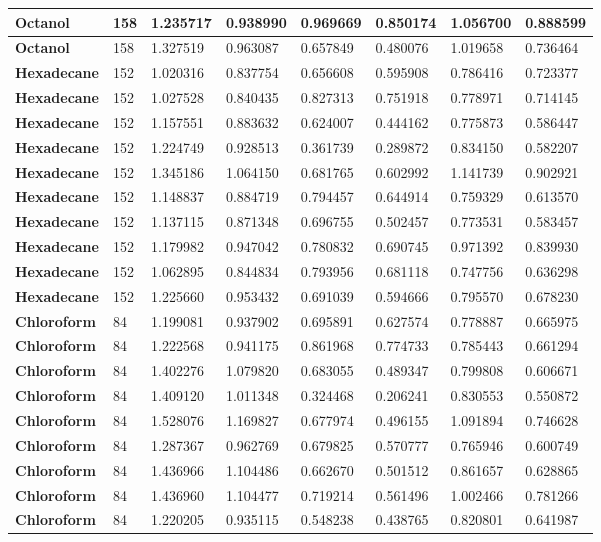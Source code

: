 \documentclass{amsart}
\begin{document}
\begin{center}
\begin{tabular}{|l|l|l|l|l|l|l|l|}
\textbf{Octanol}&158&1.235717&0.938990&0.969669&0.850174&1.056700&0.888599 \\ \hline 
\textbf{Octanol}&158&1.327519&0.963087&0.657849&0.480076&1.019658&0.736464 \\ \hline 
\textbf{Hexadecane}&152&1.020316&0.837754&0.656608&0.595908&0.786416&0.723377 \\ \hline 
\textbf{Hexadecane}&152&1.027528&0.840435&0.827313&0.751918&0.778971&0.714145 \\ \hline 
\textbf{Hexadecane}&152&1.157551&0.883632&0.624007&0.444162&0.775873&0.586447 \\ \hline 
\textbf{Hexadecane}&152&1.224749&0.928513&0.361739&0.289872&0.834150&0.582207 \\ \hline 
\textbf{Hexadecane}&152&1.345186&1.064150&0.681765&0.602992&1.141739&0.902921 \\ \hline 
\textbf{Hexadecane}&152&1.148837&0.884719&0.794457&0.644914&0.759329&0.613570 \\ \hline 
\textbf{Hexadecane}&152&1.137115&0.871348&0.696755&0.502457&0.773531&0.583457 \\ \hline 
\textbf{Hexadecane}&152&1.179982&0.947042&0.780832&0.690745&0.971392&0.839930 \\ \hline 
\textbf{Hexadecane}&152&1.062895&0.844834&0.793956&0.681118&0.747756&0.636298 \\ \hline 
\textbf{Hexadecane}&152&1.225660&0.953432&0.691039&0.594666&0.795570&0.678230 \\ \hline 
\textbf{Chloroform}& 84&1.199081&0.937902&0.695891&0.627574&0.778887&0.665975 \\ \hline 
\textbf{Chloroform}& 84&1.222568&0.941175&0.861968&0.774733&0.785443&0.661294 \\ \hline 
\textbf{Chloroform}& 84&1.402276&1.079820&0.683055&0.489347&0.799808&0.606671 \\ \hline 
\textbf{Chloroform}& 84&1.409120&1.011348&0.324468&0.206241&0.830553&0.550872 \\ \hline 
\textbf{Chloroform}& 84&1.528076&1.169827&0.677974&0.496155&1.091894&0.746628 \\ \hline 
\textbf{Chloroform}& 84&1.287367&0.962769&0.679825&0.570777&0.765946&0.600749 \\ \hline 
\textbf{Chloroform}& 84&1.436966&1.104486&0.662670&0.501512&0.861657&0.628865 \\ \hline 
\textbf{Chloroform}& 84&1.436960&1.104477&0.719214&0.561496&1.002466&0.781266 \\ \hline 
\textbf{Chloroform}& 84&1.220205&0.935115&0.548238&0.438765&0.820801&0.641987 \\ \hline 

\end{tabular}
\end{center}
\end{document}
